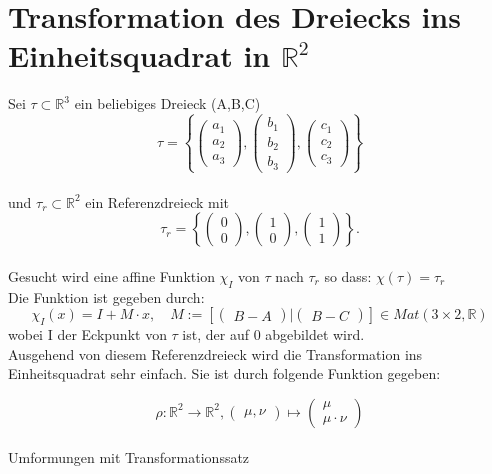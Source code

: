 \documentclass[12pt]{article}
\begin{document}
\section{Transformation des Dreiecks ins \\ Einheitsquadrat in $\mathbb{R}^2$}
Sei $\tau\subset \mathbb{R}^3$ ein beliebiges Dreieck (A,B,C)
\[
\tau = \left \{
\begin{pmatrix} a_1\\ a_2 \\ a_3 \end{pmatrix}
,
\begin{pmatrix} b_1\\ b_2 \\ b_3 \end{pmatrix}
,
\begin{pmatrix} c_1\\ c_2 \\ c_3 \end{pmatrix}
\right \}
\]
\\
und $\tau_r \subset \mathbb{R}^2$ ein Referenzdreieck mit
\[
 \tau_r = \left \{
\begin{pmatrix} 0\\ 0 \end{pmatrix}
,
\begin{pmatrix} 1\\ 0\end{pmatrix}
,
\begin{pmatrix} 1\\ 1\end{pmatrix}
\right \} .
\]
\\
Gesucht wird eine affine Funktion $\chi_I$ von $\tau$ nach $\tau_r$ so dass: $\chi(\tau) = \tau_r$
\\
Die Funktion ist gegeben durch:
\[
\chi_I(x) = I + M\cdot x, \quad M := \left[
\begin{pmatrix} B-A \end{pmatrix}
|
\begin{pmatrix} B-C \end{pmatrix}
\right]
 \in Mat(3\times 2,\mathbb{R})
\]
wobei I der Eckpunkt von $\tau$ ist, der auf 0 abgebildet wird.
\\
Ausgehend von diesem Referenzdreieck wird die Transformation ins Einheitsquadrat sehr einfach. Sie ist durch folgende Funktion gegeben:

\[
	\rho : \mathbb{R}^2 \rightarrow \mathbb{R}^2, \begin{pmatrix} \mu,\nu \end{pmatrix} \mapsto \begin{pmatrix} \mu\\\mu\cdot\nu \end{pmatrix}
\]
\\
Umformungen mit Transformationssatz
\newpage
\end{document}
